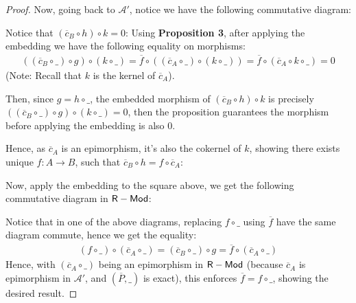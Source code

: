 \documentclass{article}
\begin{document}
\begin{proof}
    Now, going back to $\mathcal{A}'$, notice we have the following commutative diagram:
    \begin{center}
    \end{center}
    Notice that $(\overline{c}_B\circ h)\circ k = 0$: Using \textbf{Proposition 3}, after applying the embedding we have the following equality on morphisms:
    \begin{align}
        ((\overline{c}_B\circ\_)\circ g)\circ (k\circ\_) = \overline{f}\circ ((\overline{c}_A\circ \_)\circ (k\circ\_)) = \overline{f}\circ (\overline{c}_A\circ k\circ \_) = 0
    \end{align}
    (Note: Recall that $k$ is the kernel of $\overline{c}_A$).

    Then, since $g=h\circ\_$, the embedded morphism of $(\overline{c}_B\circ h)\circ k$ is precisely $((\overline{c}_B\circ\_)\circ g)\circ (k\circ\_)=0$, then the proposition guarantees the morphism before applying the embedding is also $0$.

    Hence, as $\overline{c}_A$ is an epimorphism, it's also the cokernel of $k$, showing there exists unique $f:A\rightarrow B$, such that $\overline{c}_B\circ h =f\circ \overline{c}_A$:
    \begin{center}
    \end{center}
    Now, apply the embedding to the square above, we get the following commutative diagram in $\mathsf{R-Mod}$:
    \begin{center}
    \end{center}
    Notice that in one of the above diagrams, replacing $f\circ\_$ using $\overline{f}$ have the same diagram commute, hence we get the equality:
    \begin{align}
        (f\circ \_)\circ (\overline{c}_A\circ\_) = (\overline{c}_B\circ\_)\circ g = \overline{f}\circ (\overline{c}_A\circ\_)
    \end{align}
    Hence, with $(\overline{c}_A\circ\_)$ being an epimorphism in $\mathsf{R-Mod}$ (because $\overline{c}_A$ is epimorphism in $\mathcal{A}'$, and $(\overline{P},\_)$ is exact), this enforces $\overline{f}=f\circ\_$, showing the desired result.
\end{proof}
\end{document}
